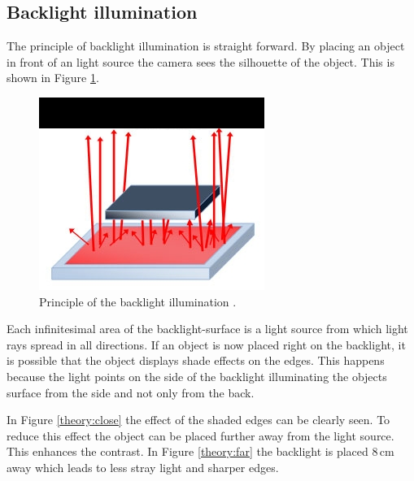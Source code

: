 \subsection{Backlight illumination}
The principle of backlight illumination is straight forward.
By placing an object in front of an light source the camera sees the silhouette of the object.
This is shown in Figure \ref{theory:backlight}.
\begin{figure}[ht]
	\centering
	\includegraphics[trim=0 0 0 38,clip,width=0.5\linewidth]{2-theory/backlight/principle_backlight_illumination.jpg}
	\caption{Principle of the backlight illumination \cite{backlight}.\label{theory:backlight}}	
\end{figure}

Each infinitesimal area of the backlight-surface is a light source from which light rays spread in all directions.
If an object is now placed right on the backlight, it is possible that the object displays shade effects on the edges.
This happens because the light points on the side of the backlight illuminating the objects surface from the side and not only from the back. 

In Figure \ref{theory:close} the effect of the shaded edges can be clearly seen.
To reduce this effect the object can be placed further away from the light source.
This enhances the contrast.
In Figure \ref{theory:far} the backlight is placed 8\,cm away which leads to less stray light and sharper edges.

